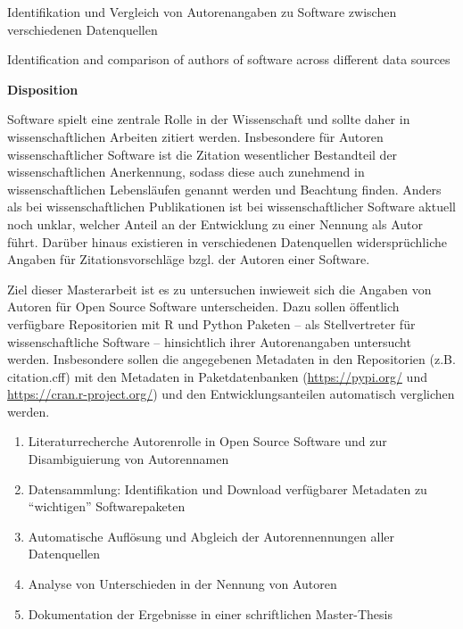 Identifikation und Vergleich von Autorenangaben zu Software zwischen verschiedenen Datenquellen
\vspace*{-.5cm}

\noindent\makebox[\linewidth]{\rule{\linewidth}{0.4pt}}
Identification and comparison of authors of software across different data sources

\vspace*{-.5cm}
\noindent\makebox[\linewidth]{\rule{\linewidth}{0.4pt}}

\textbf{Disposition}
\vspace*{.1cm}

Software spielt eine zentrale Rolle in der Wissenschaft und sollte daher in wissenschaftlichen Arbeiten zitiert werden.
Insbesondere für Autoren wissenschaftlicher Software ist die Zitation wesentlicher Bestandteil der wissenschaftlichen Anerkennung, sodass diese auch zunehmend in wissenschaftlichen Lebensläufen genannt werden und Beachtung finden.
Anders als bei wissenschaftlichen Publikationen ist bei wissenschaftlicher Software aktuell noch unklar, welcher Anteil an der Entwicklung zu einer Nennung als Autor führt.
Darüber hinaus existieren in verschiedenen Datenquellen widersprüchliche Angaben für Zitationsvorschläge bzgl. der Autoren einer Software.

Ziel dieser Masterarbeit ist es zu untersuchen inwieweit sich die Angaben von Autoren für Open Source Software unterscheiden. 
Dazu sollen öffentlich verfügbare Repositorien mit R und Python Paketen -- als Stellvertreter für wissenschaftliche Software -- hinsichtlich ihrer Autorenangaben untersucht werden.
Insbesondere sollen die angegebenen Metadaten in den Repositorien (z.B. citation.cff) mit den Metadaten in Paketdatenbanken (\url{https://pypi.org/} und \url{https://cran.r-project.org/}) und den Entwicklungsanteilen automatisch verglichen werden.

\begin{enumerate}
    \item Literaturrecherche Autorenrolle in Open Source Software und zur Disambiguierung von Autorennamen 
    \item Datensammlung: Identifikation und Download verfügbarer Metadaten zu \enquote{wichtigen} Softwarepaketen
    \item Automatische Auflösung und Abgleich der Autorennennungen aller Datenquellen
    \item Analyse von Unterschieden in der Nennung von Autoren
    \item Dokumentation der Ergebnisse in einer schriftlichen Master-Thesis
\end{enumerate}
